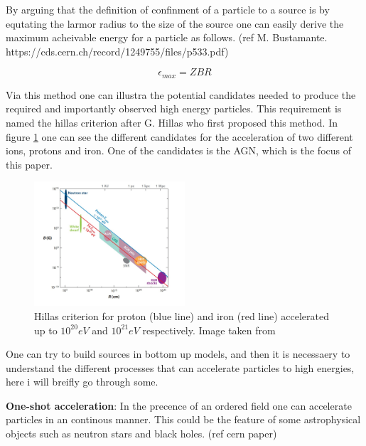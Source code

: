 \documentclass{article}
\begin{document}
By arguing that the definition of confinment of a particle to a source is by equtating the larmor radius to the size of the source one can 
easily derive the maximum acheivable energy for a particle as follows. (ref M. Bustamante. https://cds.cern.ch/record/1249755/files/p533.pdf)

\begin{equation}
    \epsilon_{max} = ZBR
\end{equation}

Via this method one can illustra the potential candidates needed to produce the required and importantly observed high energy particles. 
This requirement is named the hillas criterion after G. Hillas who first proposed this method.
In figure \ref{fig:hillas_c} one can see the different candidates for the acceleration of two different ions, protons and iron. One of the candidates is the AGN, which is the focus of this paper.

\begin{figure}
    \centering
    \includegraphics[width = 0.5\textwidth]{hillas_criterion.jpeg}
    \caption{Hillas criterion for proton (blue line) and iron (red line) accelerated up to $10^{20}eV$ and $10^{21}eV$ respectively. Image taken from \cite{doi:10.1146/annurev-astro-081710-102620}}
    \label{fig:hillas_c}
\end{figure}


One can try to build sources in bottom up models, and then it is necessaery to understand the different processes that can accelerate particles to high energies, here i will breifly go through some. 

\textbf{One-shot acceleration}:
In the precence of an ordered field one can accelerate particles in an continous manner. This could be the feature of some astrophysical objects such as neutron stars and black holes. (ref cern paper)
\end{document}
